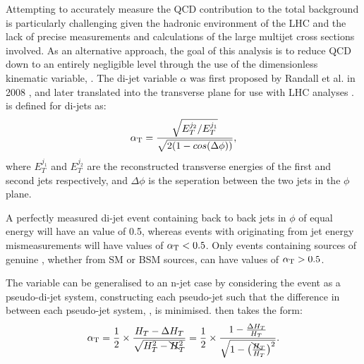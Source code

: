 Attempting to accurately measure the QCD contribution to the total background is
particularly challenging given the hadronic environment of the LHC and the lack
of precise measurements and calculations of the large multijet cross sections
involved. As an
alternative approach, the goal of this analysis is to reduce QCD down to an
entirely negligible level through the use of the dimensionless kinematic
variable, \alphat. The di-jet variable
$\alpha$ was first proposed by Randall et al. in 2008 \cite{Randall:2008rw},
and later translated into the transverse plane for use with LHC analyses
\cite{CMS:2008vya, CMS-PAS-SUS-09-001}.
\alphat is defined for di-jets as:
% 
\begin{equation}
\alpha_{\text{T}} = \frac{ \sqrt{E_T^{j_2}/E_T^{j_1}} }{ \sqrt{2(1-cos(\Delta \phi))} } ,
\label{eq:alphat_di-jet}
\end{equation}
% 
where $E_T^{j_1}$ and $E_T^{j_2}$ are the reconstructed transverse energies of 
the first and second jets respectively, and $\Delta \phi$ is the seperation 
between the two jets in the $\phi$ plane.

A perfectly measured di-jet event containing back to back jets in $\phi$ of equal energy will
have an \alphat value of 0.5, whereas 
events with \met originating from jet energy mismeasurements will have values of $\alpha_{\text{T}}<0.5$.
Only events containing sources of genuine \met, whether from SM or BSM sources,
can have values of $\alpha_{\text{T}} > 0.5$.
% 
% 
% 
% 

The \alphat variable can be generalised to an n-jet case by considering the event as a 
pseudo-di-jet system, constructing each pseudo-jet such that the difference in \HT
between each pseudo-jet system, \deltaHT, is minimised. \alphat then takes the 
form:
% 
\begin{equation}
\alpha_{\text{T}} = \frac{1}{2} \times \frac{H_T-\Delta H_T}{\sqrt{H_T^2 - \bcancel{H}_T^2}} = 
\frac{1}{2} \times \frac{1-\frac{\Delta H_T}{H_T}}{\sqrt{1 - \big(\frac{\bcancel{H}_T}
{H_T}\big)^2}}.
\label{eq:alphat_njet}
\end{equation}
% 

